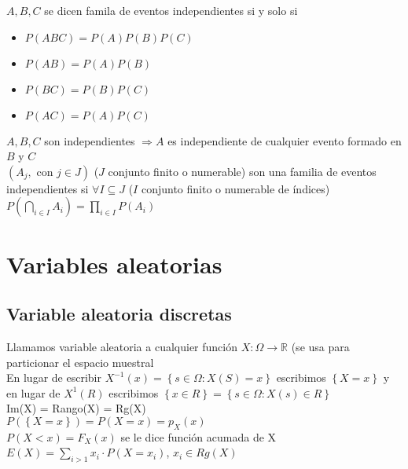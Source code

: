 \documentclass[a4paper,10pt]{article}
\begin{document}
 $A,B,C$ se dicen famila de eventos independientes si y solo si 

\begin{itemize}
	\item $P(ABC) = P(A)P(B)P(C)$
	\item $P(AB) = P(A)P(B)$
	\item $P(BC) = P(B)P(C)$
	\item $P(AC) = P(A)P(C)$
\end{itemize}

\propiedad $A,B,C$ son independientes $ \Rightarrow A$ es independiente de cualquier evento formado en $B$ y $C$ \\

\propiedad $(A_j, \mbox{ con } j \in J)$ ($J$ conjunto finito o numerable) son una familia de eventos independientes si $\forall I \subseteq J$ ($I$ conjunto finito o numerable de índices) \\
$\displaystyle P \left( \bigcap_{i \in I} {A_i} \right) = \prod_{i \in I} {P(A_i)}$

\section{Variables aleatorias}

\subsection{Variable aleatoria discretas}

 Llamamos variable aleatoria a cualquier función $X : \Omega \longrightarrow \mathbb{R}$ (se usa para particionar el espacio muestral \\

\notacion En lugar de escribir $X^{-1}(x) = \left\lbrace s \in \Omega : X(S) = x \right\rbrace$ escribimos $\left\lbrace X = x \right\rbrace$ y en lugar de $X^{1}(R)$ escribimos $\left\lbrace x \in R \right\rbrace = \left\lbrace s \in \Omega : X(s) \in R \right\rbrace$ \\

\notacion Im(X) = Rango(X) = Rg(X) \\

\notacion $P(\left\{X = x \right\}) = P(X = x) = p_X(x)$ \\

\notacion $P(X < x) = F_X(x)$ se le dice función acumada de X\\ 

 $E(X) = \sum_{i>1} x_i \cdot P(X = x_i)$, $x_i \in Rg(X)$ \\
\end{document}
